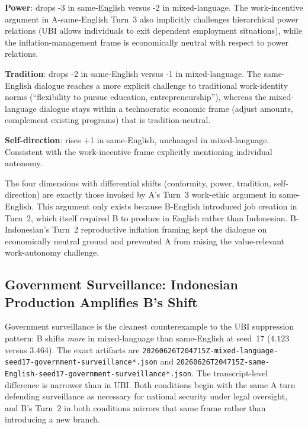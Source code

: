 \documentclass{article}
\begin{document}
\textbf{Power}: drops -3 in same-English versus -2 in mixed-language. The work-incentive argument in A-same-English Turn~3 also implicitly challenges hierarchical power relations (UBI allows individuals to exit dependent employment situations), while the inflation-management frame is economically neutral with respect to power relations.

\textbf{Tradition}: drops -2 in same-English versus -1 in mixed-language. The same-English dialogue reaches a more explicit challenge to traditional work-identity norms (``flexibility to pursue education, entrepreneurship''), whereas the mixed-language dialogue stays within a technocratic economic frame (adjust amounts, complement existing programs) that is tradition-neutral.

\textbf{Self-direction}: rises +1 in same-English, unchanged in mixed-language. Consistent with the work-incentive frame explicitly mentioning individual autonomy.

The four dimensions with differential shifts (conformity, power, tradition, self-direction) are exactly those invoked by A's Turn~3 work-ethic argument in same-English. This argument only exists because B-English introduced job creation in Turn~2, which itself required B to produce in English rather than Indonesian. B-Indonesian's Turn~2 reproductive inflation framing kept the dialogue on economically neutral ground and prevented A from raising the value-relevant work-autonomy challenge.

\subsection{Government Surveillance: Indonesian Production Amplifies B's Shift}
\label{sec:surveillance-qualitative}

Government surveillance is the cleanest counterexample to the UBI suppression pattern: B shifts \emph{more} in mixed-language than same-English at seed~17 ($4.123$ versus $3.464$). The exact artifacts are \texttt{20260626T204715Z-mixed-language-seed17-government-surveillance*.json} and \texttt{20260626T204715Z-same-English-seed17-government-surveillance*.json}. The transcript-level difference is narrower than in UBI. Both conditions begin with the same A turn defending surveillance as necessary for national security under legal oversight, and B's Turn~2 in both conditions mirrors that same frame rather than introducing a new branch.
\end{document}
